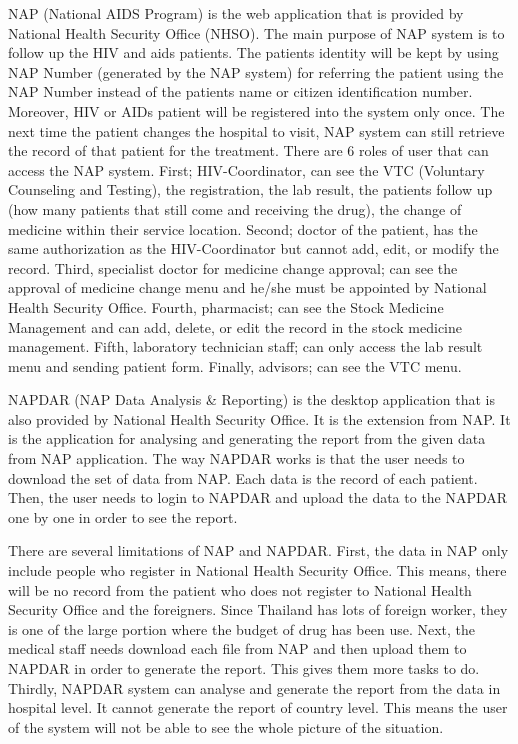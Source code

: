     NAP (National AIDS Program) is the web application that is provided by National Health Security Office (NHSO). The main purpose of NAP system is to follow up the HIV and aids patients. The patients identity will be kept by using NAP Number (generated by the NAP system) for referring the patient using the NAP Number instead of the patients name or citizen identification number. Moreover, HIV or AIDs patient will be registered into the system only once. The next time the patient changes the hospital to visit, NAP system can still retrieve the record of that patient for the treatment. There are 6 roles of user that can access the NAP system. First; HIV-Coordinator, can see the VTC (Voluntary Counseling and Testing), the registration, the lab result, the patients follow up (how many patients that still come and receiving the drug), the change of medicine within their service location. Second; doctor of the patient, has the same authorization as the HIV-Coordinator but cannot add, edit, or modify the record. Third, specialist doctor for medicine change approval; can see the approval of medicine change menu and he/she must be appointed by National Health Security Office. Fourth, pharmacist; can see the Stock Medicine Management and can add, delete, or edit the record in the stock medicine management. Fifth, laboratory technician staff; can only access the lab result menu and sending patient form. Finally, advisors; can see the VTC menu.
    
    NAPDAR (NAP Data Analysis \& Reporting) is the desktop application that is also provided by National Health Security Office. It is the extension from NAP. It is the application for analysing and generating the report from the given data from NAP application. The way NAPDAR works is that the user needs to download the set of data from NAP. Each data is the record of each patient. Then, the user needs to login to NAPDAR and upload the data to the NAPDAR one by one in order to see the report.
    
    
	
	There are several limitations of NAP and NAPDAR. First, the data in NAP only include people who register in National Health Security Office. This means, there will be no record from the patient who does not register to National Health Security Office and the foreigners. Since Thailand has lots of foreign worker, they is one of the large portion where the budget of drug has been use. Next, the medical staff needs download each file from NAP and then upload them to NAPDAR in order to generate the report. This gives them more tasks to do. Thirdly, NAPDAR system can analyse and generate the report from the data in hospital level. It cannot generate the report of country level. This means the user of the system will not be able to see the whole picture of the situation.	


